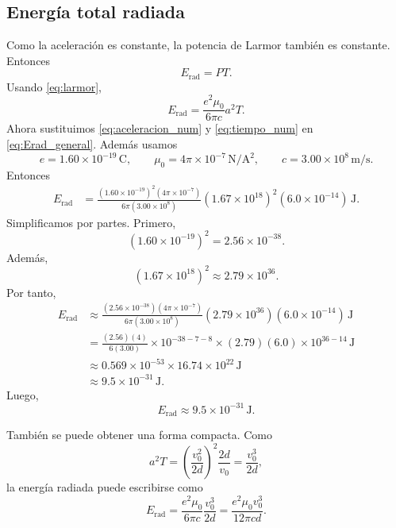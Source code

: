 \documentclass{article}
\numberwithin{equation}{section}
\begin{document}
\subsection{Energ\'ia total radiada}

Como la aceleraci\'on es constante, la potencia de Larmor tambi\'en es
constante. Entonces
\begin{equation*}
  E_{\mathrm{rad}}=PT.
\end{equation*}
Usando \eqref{eq:larmor},
\begin{equation}
  E_{\mathrm{rad}}
  =\frac{e^2\mu_0}{6\pi c}a^2T.
  \label{eq:Erad_general}
\end{equation}
Ahora sustituimos \eqref{eq:aceleracion_num} y \eqref{eq:tiempo_num} en \eqref{eq:Erad_general}. Adem\'as usamos
\begin{equation*}
  e=1.60\times10^{-19}\,\mathrm{C},
  \qquad
  \mu_0=4\pi\times10^{-7}\,\mathrm{N/A^2},
  \qquad
  c=3.00\times10^8\,\mathrm{m/s}.
\end{equation*}
Entonces
\begin{align*}
  E_{\mathrm{rad}}
  &=\frac{(1.60\times10^{-19})^2(4\pi\times10^{-7})}{6\pi(3.00\times10^8)}
  (1.67\times10^{18})^2(6.0\times10^{-14})\,\mathrm{J}.
\end{align*}
Simplificamos por partes. Primero,
\begin{equation*}
  (1.60\times10^{-19})^2=2.56\times10^{-38}.
\end{equation*}
Adem\'as,
\begin{equation*}
  (1.67\times10^{18})^2\approx2.79\times10^{36}.
\end{equation*}
Por tanto,
\begin{align*}
  E_{\mathrm{rad}}
  &\approx
  \frac{(2.56\times10^{-38})(4\pi\times10^{-7})}{6\pi(3.00\times10^8)}
  (2.79\times10^{36})(6.0\times10^{-14})\,\mathrm{J} \\
  &=
  \frac{(2.56)(4)}{6(3.00)}
  \times 10^{-38-7-8}
  \times(2.79)(6.0)\times10^{36-14}\,\mathrm{J} \\
  &\approx
  0.569\times10^{-53}\times16.74\times10^{22}\,\mathrm{J} \\
  &\approx9.5\times10^{-31}\,\mathrm{J}.
\end{align*}
Luego,
\begin{equation*}
  \boxed{E_{\mathrm{rad}}\approx9.5\times10^{-31}\,\mathrm{J}.}
\end{equation*}

Tambi\'en se puede obtener una forma compacta. Como
\begin{equation*}
  a^2T=\left(\frac{v_0^2}{2d}\right)^2\frac{2d}{v_0}
  =\frac{v_0^3}{2d},
\end{equation*}
la energ\'ia radiada puede escribirse como
\begin{equation*}
  E_{\mathrm{rad}}
  =\frac{e^2\mu_0}{6\pi c}\frac{v_0^3}{2d}
  =\boxed{\frac{e^2\mu_0v_0^3}{12\pi cd}}.
\end{equation*}
\end{document}
